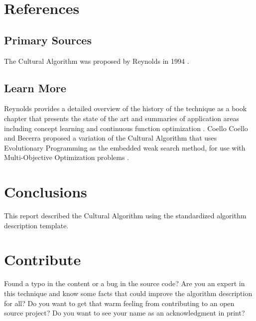 \documentclass[a4paper, 11pt]{article}
\begin{document}
\section{References}
\label{sec:references}

% 
% 
\subsection{Primary Sources}
The Cultural Algorithm was proposed by Reynolds in 1994 \cite{Reynolds1994}. 

% 
% 
\subsection{Learn More}
Reynolds provides a detailed overview of the history of the technique as a book chapter that presents the state of the art and summaries of application areas including concept learning and continuous function optimization \cite{Reynolds1999}.
Coello Coello and Becerra proposed a variation of the Cultural Algorithm that uses Evolutionary Programming as the embedded weak search method, for use with Multi-Objective Optimization problems \cite{CoelloCoello2003}.


% 
% 
\section{Conclusions}
\label{sec:conclusions}
This report described the Cultural Algorithm using the standardized algorithm description template.

% 
% 
\section{Contribute}
\label{sec:contribute}
Found a typo in the content or a bug in the source code? 
Are you an expert in this technique and know some facts that could improve the algorithm description for all?
Do you want to get that warm feeling from contributing to an open source project? 
Do you want to see your name as an acknowledgment in print?
\end{document}
